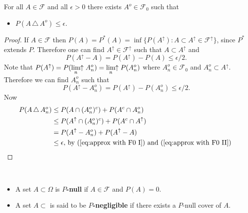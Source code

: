 \begin{theorem}
\label{approximating P with F0}
For all $A\in \mathcal F$ and all $\epsilon>0$ there exists $A^o\in\mathcal F_0$ such that
\begin{itemize}
\item $P(A\,\triangle\, A^o)\leq \epsilon$.
\end{itemize}
\end{theorem}
\begin{proof}
If $A\in \mathcal F$ then $P(A) = P^*(A) =  \inf\{P(A^\uparrow)\colon A\subset A^\uparrow \in \mathcal F^\uparrow  \}$, since $P^*$ extends $P$. Therefore one can find $A^\uparrow \in \mathcal F^\uparrow$ such that $A\subset A^\uparrow$ and
\begin{equation}
\label{eq:approx with F0 I}
P(A^\uparrow - A) =  P(A^\uparrow) -  P(A)   \leq \epsilon / 2.
\end{equation}
Note that  $P(A^\uparrow) = P(\displaystyle\lim_{n}\!\!\uparrow A_n^o) = \displaystyle\lim_{n}\!\!\uparrow P(A_n^o) $ where $A_n^o\in \mathcal F_0$ and $A_n^o\subset A^\uparrow$. Therefore we can find $A_n^o$ such that
\begin{equation}
\label{eq:approx with F0 II}
P(A^\uparrow -  A_n^o) =  P(A^\uparrow) -  P(A_n^o)   \leq \epsilon / 2.
\end{equation}
Now
\begin{align*}
P(A\,\triangle\, A_n^o)
&\leq P(A\cap (A_n^o)^c) + P(A^c \cap A_n^o)\\
&\leq P(A^\uparrow \cap (A_n^o)^c) + P(A^c \cap A^\uparrow)\\
&= P(A^\uparrow - A_n^o) + P(A^\uparrow - A)\\
&\leq \epsilon,\,\text{by (\ref{eq:approx with F0 I}) and (\ref{eq:approx with F0 II}) }
\end{align*}

\end{proof}


\begin{definition}
$\phantom{asdf}$
\begin{itemize}
\item
A set $A\subset \Omega$ is  {\bf $P$-null}  if $A\in\mathcal F$ and  $P(A)=0$.
\item
A set $A\subset$ is said to be {\bf $P$-negligible} if there exists a $P$-null cover of $A$.
\end{itemize}
\end{definition}


